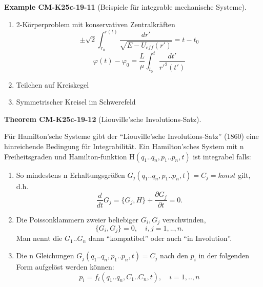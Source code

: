 \documentclass[10pt, letterpaper]{article}
\newcommand{\CustomHeading}[3]{%
  \par\medskip\noindent%
  \textbf{#1 #2} \textnormal{(#3)}.\enskip%
}
\newenvironment{THEO}[2]{\CustomHeading{Theorem}{#1}{#2}}{}
\newenvironment{EXA}[2]{\CustomHeading{Example}{#1}{#2}}{}
\begin{document}
\begin{EXA}{CM-K25c-19-11}{Beispiele für integrable mechanische Systeme}
\begin{enumerate}
\item 2-Körperproblem mit konservativen Zentralkräften
\[
\pm\sqrt{2}\int_{r_0}^{r(t)}\frac{dr'}{\sqrt{E-U_{eff}(r')}} = t-t_0
\]
\[
\varphi(t)-\varphi_0 = \frac{L}{\mu}\int_{t_0}^t\frac{dt'}{r'^2(t')}
\]

\item Teilchen auf Kreiskegel

\item Symmetrischer Kreisel im Schwerefeld
\end{enumerate}
\end{EXA}

\begin{THEO}{CM-K25c-19-12}{Liouville'sche Involutions-Satz}
Für Hamilton'sche Systeme gibt der ``Liouville'sche Involutions-Satz'' (1860) eine hinreichende Bedingung für Integrabilität.
\noindent
Ein Hamilton'sches System mit n Freiheitsgraden und Hamilton-funktion H$(q_1..q_n,p_1..p_n,t)$ ist integrabel falls:

\begin{enumerate}
\item So mindestens n Erhaltungsgrößen $G_j(q_1..q_n,p_1..p_n,t)=C_j=konst$ gilt, d.h. 
\[\frac{d}{dt}G_j = \{G_j,H\} + \frac{\partial G_j}{\partial t} = 0.\]

\item Die Poissonklammern zweier beliebiger $G_i,G_j$ verschwinden,
\[\{G_i,G_j\} = 0, \quad i,j=1,..,n.\]
Man nennt die $G_1..G_n$ dann ``kompatibel'' oder auch ``in Involution''.

\item Die n Gleichungen $G_j(q_1..q_n,p_1..p_n,t)=C_j$ nach den $p_i$ in der folgenden Form aufgelöst werden können:
\[p_i = f_i(q_1..q_n,C_1..C_n,t), \quad i=1,..,n\]
\end{enumerate}
\end{THEO}
\end{document}
